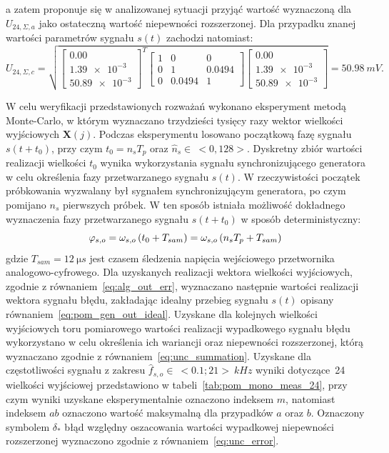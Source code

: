 a zatem proponuje się w analizowanej sytuacji przyjąć wartość wyznaczoną dla $U_{24,\Sigma,a}$ jako ostateczną wartość niepewności rozszerzonej. Dla przypadku znanej wartości parametrów sygnału $s(t)$ zachodzi natomiast:
\begin{equation}
U_{24,\Sigma,c} = \sqrt{
\begin{bmatrix}
\num{0.00} \\ \num{1.39e-3} \\ \num{50.89e-3}
\end{bmatrix}^{T}
\begin{bmatrix}
\num{1} & \num{0} & \num{0} \\
\num{0} & \num{1} & \num{0.0494} \\
\num{0} & \num{0.0494} & \num{1}
\end{bmatrix}
\begin{bmatrix}
\num{0.00} \\ \num{1.39e-3} \\ \num{50.89e-3}
\end{bmatrix}} = \qty{50.98}{mV}
\label{eq:pom_mono_all_unc_c}.
\end{equation}

W celu weryfikacji przedstawionych rozważań wykonano eksperyment metodą Monte-Carlo, w którym wyznaczano trzydzieści tysięcy razy wektor wielkości wyjściowych $\mathbf{X}(j)$. Podczas eksperymentu losowano początkową fazę sygnału $s(t+t_{0})$, przy czym $t_{0} = n_{s} T_{p}$ oraz $\hat{n}_{s} \in~<0,128>$. Dyskretny zbiór wartości realizacji wielkości $t_{0}$ wynika wykorzystania sygnału synchronizującego generatora w celu określenia fazy przetwarzanego sygnału $s(t)$. W rzeczywistości początek próbkowania wyzwalany był sygnałem synchronizującym generatora, po czym pomijano $n_{s}$ pierwszych próbek. W ten sposób istniała możliwość dokładnego wyznaczenia fazy przetwarzanego sygnału $s(t+t_{0})$ w sposób deterministyczny:
\begin{equation}
\varphi_{s,o} = \omega_{s,o} \left(t_{0} + T_{sam}\right) = \omega_{s,o} \left(n_{s} T_{p} + T_{sam}\right) \label{eq:pom_mono_delay}
\end{equation}
gdzie $T_{sam} = \qty{12}{\micro s}$ jest czasem śledzenia napięcia wejściowego przetwornika analogowo-cyfrowego. Dla uzyskanych realizacji wektora wielkości wyjściowych, zgodnie z równaniem~\eqref{eq:alg_out_err}, wyznaczano następnie wartości realizacji wektora sygnału błędu, zakładając idealny przebieg sygnału $s(t)$ opisany równaniem~\eqref{eq:pom_gen_out_ideal}. Uzyskane dla kolejnych wielkości wyjściowych toru pomiarowego wartości realizacji wypadkowego sygnału błędu wykorzystano w celu określenia ich wariancji oraz niepewności rozszerzonej, którą wyznaczano zgodnie z równaniem~\eqref{eq:unc_summation}. Uzyskane dla częstotliwości sygnału z zakresu $\hat{f}_{s,o} \in~<\num{0.1};\num{21}>~\unit{kHz}$ wyniki dotyczące~\qty{24}{\numTej} wielkości wyjściowej przedstawiono w tabeli~\ref{tab:pom_mono_meas_24}, przy czym wyniki uzyskane eksperymentalnie oznaczono indeksem $m$, natomiast indeksem $ab$ oznaczono wartość maksymalną dla przypadków $a$ oraz $b$. Oznaczony symbolem $\delta_{*}$ błąd względny oszacowania wartości wypadkowej niepewności rozszerzonej wyznaczono zgodnie z równaniem~\eqref{eq:unc_error}.

